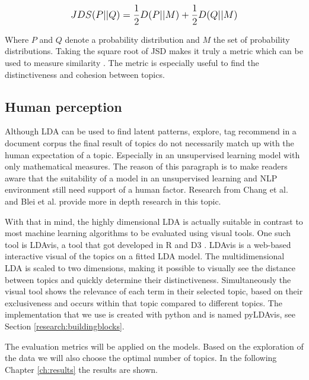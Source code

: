 \[
\mathlarger{JDS(P||Q) = \frac{1}{2}D(P||M) + \frac{1}{2}D(Q||M)}
\]

Where $P$ and $Q$ denote a probability distribution and $M$ the set of probability distributions. Taking the square root of JSD makes it truly a metric which can be used to measure similarity \cite{Huang2008}. The metric is especially useful to find the distinctiveness and cohesion between topics.

\subsection{Human perception}\label{methodology:humanperception}
Although LDA can be used to find latent patterns, explore, tag recommend in a document corpus the final result of topics do not necessarily match up with the human expectation of a topic. Especially in an unsupervised learning model with only mathematical measures\cite{Towne2016MeasuringPerception}. The reason of this paragraph is to make readers aware that the suitability of a model in an unsupervised learning and NLP environment still need support of a human factor. Research from Chang  et al. \cite{Chang2009} and Blei et al. \cite{Chaney2012VisualizingModels.} provide more in depth research in this topic.  

With that in mind, the highly dimensional LDA is actually suitable in contrast to most machine learning algorithms to be evaluated using visual tools. One such tool is LDAvis, a tool that got developed in R and D3 \cite{Sievert2014}. LDAvis is a web-based interactive visual of the topics on a fitted LDA model. The multidimensional LDA is scaled to two dimensions, making it possible to visually see the distance between topics and quickly determine their distinctiveness. Simultaneously the visual tool shows the relevance of each term in their selected topic, based on their exclusiveness and occurs within that topic compared to different topics. The implementation that we use is created with python and is named pyLDAvis, see Section \ref{research:buildingblocks}. 

The evaluation metrics will be applied on the models. Based on the exploration of the data we will also choose the optimal number of topics. In the following Chapter \ref{ch:results} the results are shown. 